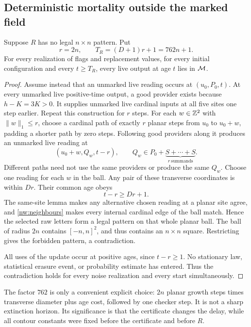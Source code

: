 \subsection{Deterministic mortality outside the marked field}

\begin{lemma}\label{nw:mortality}
Suppose $R$ has no legal $n\times n$ pattern. Put
\begin{equation}\label{nw:delay}
 r=2n,\qquad T_R=(D+1)r+1=762n+1.
\end{equation}
For every realization of flags and replacement values, for every initial configuration and every $t\ge T_R$, every live output at age $t$ lies in $\mathcal M$.
\end{lemma}
\begin{proof}
Assume instead that an unmarked live reading occurs at $(u_0,P_0,t)$. At every unmarked live positive-time output, a good provider exists because $h-K=3K>0$. It supplies unmarked live cardinal inputs at all five sites one step earlier. Repeat this construction for $r$ steps. For each $w\in\mathbb{Z}^2$ with $\|w\|_1\le r$, choose a cardinal path of exactly $r$ planar steps from $u_0$ to $u_0+w$, padding a shorter path by zero steps. Following good providers along it produces an unmarked live reading at
\[
 (u_0+w,Q_w,t-r),\qquad
 Q_w\in P_0+\underbrace{S+\cdots+S}_{r\ \mathrm{summands}}.
\]
Different paths need not use the same providers or produce the same $Q_w$. Choose one reading for each $w$ in the ball. Any pair of these transverse coordinates is within $Dr$. Their common age obeys
\[
 t-r\ge Dr+1.
\]
The same-site lemma makes any alternative chosen reading at a planar site agree, and \cref{nw:neighbours} makes every internal cardinal edge of the ball match. Hence the selected raw letters form a legal pattern on that whole planar ball. The ball of radius $2n$ contains $[-n,n]^2$, and thus contains an $n\times n$ square. Restricting gives the forbidden pattern, a contradiction.

All uses of the update occur at positive ages, since $t-r\ge1$. No stationary law, statistical erasure event, or probability estimate has entered. Thus the contradiction holds for every noise realization and every start simultaneously.
\end{proof}

The factor $762$ is only a convenient explicit choice: $2n$ planar growth steps times transverse diameter plus age cost, followed by one checker step. It is not a sharp extinction horizon. Its significance is that the certificate changes the delay, while all contour constants were fixed before the certificate and before $R$.

